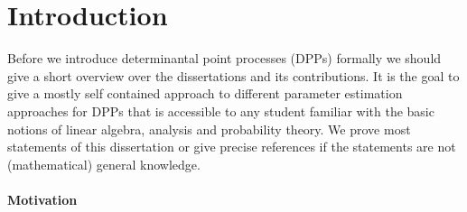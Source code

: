 \chapter*{Introduction}








Before we introduce determinantal point processes (DPPs) formally we should give a short overview over the dissertations and its contributions. It is the goal to give a mostly self contained approach to different parameter estimation approaches for DPPs that is accessible to any student familiar with the basic notions of linear algebra, analysis and probability theory. We prove most statements of this dissertation or give precise references if the statements are not (mathematical) general knowledge.

\subsubsection*{Motivation}

